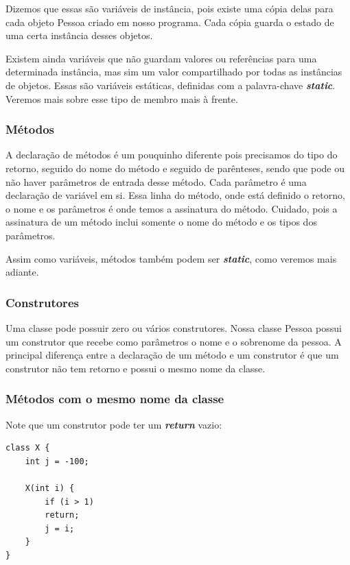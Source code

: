 \documentclass[12pt]{article}
\begin{document}
Dizemos que essas são variáveis de instância, pois existe uma cópia delas para cada objeto Pessoa criado em nosso programa. Cada cópia guarda o estado de uma certa instância desses objetos.

Existem ainda variáveis que não guardam valores ou referências para uma determinada instância, mas sim um valor compartilhado por todas as instâncias de objetos. Essas são variáveis estáticas, definidas com a palavra-chave \textbf{\textit{static}}. Veremos mais sobre esse tipo de membro mais à frente.

\subsubsection{Métodos}

A declaração de métodos é um pouquinho diferente pois precisamos do tipo do retorno, seguido do nome do método e seguido de parênteses, sendo que pode ou não haver parâmetros de entrada desse método. Cada parâmetro é uma declaração de variável em si. Essa linha do método, onde está definido o retorno, o nome e os parâmetros é onde temos a assinatura do método. Cuidado, pois a assinatura de um método inclui somente o nome do método e os tipos dos parâmetros.

Assim como variáveis, métodos também podem ser \textbf{\textit{static}}, como veremos mais adiante.

\subsubsection{Construtores}

Uma classe pode possuir zero ou vários construtores. Nossa classe Pessoa possui um construtor que recebe como parâmetros o nome e o sobrenome da pessoa. A principal diferença entre a declaração de um método e um construtor é que um construtor não tem retorno e possui o mesmo nome da classe.

\subsubsection{Métodos com o mesmo nome da classe}

Note que um construtor pode ter um \textbf{\textit{return}} vazio:

\begin{lstlisting}
class X {
	int j = -100;
	
	X(int i) {
		if (i > 1)
		return;
		j = i;
	}
}
\end{lstlisting}
\end{document}
